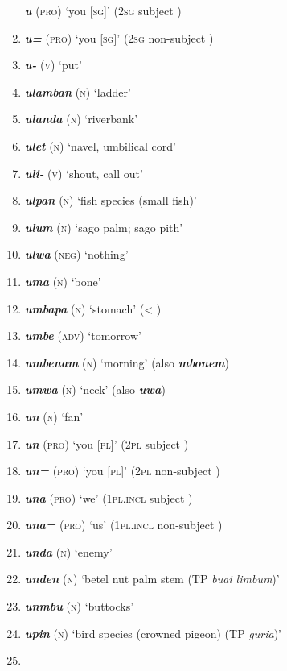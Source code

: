 \begin{enumerate}[noitemsep, label={}, align=left, widest=190, labelsep=1ex,leftmargin=*,itemindent=-10pt]
\textbf{\textit{u}} (\textsc{pro}) ‘you [\textsc{sg}]’ (2\textsc{sg} subject ) \item
\textbf{\textit{u=}} (\textsc{pro}) ‘you [\textsc{sg}]’ (2\textsc{sg} non-subject ) \item
\textbf{\textit{u-}} (\textsc{v}) ‘put’ \item
\textbf{\textit{ulamban}} (\textsc{n}) ‘ladder’ \item
\textbf{\textit{ulanda}} (\textsc{n}) ‘riverbank’ \item
\textbf{\textit{ulet}} (\textsc{n}) ‘navel, umbilical cord’ \item
\textbf{\textit{uli-}} (\textsc{v}) ‘shout, call out’ \item
\textbf{\textit{ulpan}} (\textsc{n}) ‘fish species (small fish)’ \item
\textbf{\textit{ulum}} (\textsc{n}) ‘sago palm; sago pith’ \item
\textbf{\textit{ulwa}} (\textsc{neg}) ‘nothing’ \item
\textbf{\textit{uma}} (\textsc{n}) ‘bone’ \item
\textbf{\textit{umbapa}} (\textsc{n}) ‘stomach’ (< ) \item
\textbf{\textit{umbe}} (\textsc{adv}) ‘tomorrow’ \item
\textbf{\textit{umbenam}} (\textsc{n}) ‘morning’ (also \textbf{\textit{mbonem}}) \item
\textbf{\textit{umwa}} (\textsc{n}) ‘neck’ (also \textbf{\textit{uwa}}) \item
\textbf{\textit{un}} (\textsc{n}) ‘fan’ \item
\textbf{\textit{un}} (\textsc{pro}) ‘you [\textsc{pl}]’ (\textsc{2pl} subject ) \item
\textbf{\textit{un=}} (\textsc{pro}) ‘you [\textsc{pl}]’ (\textsc{2pl} non-subject ) \item
\textbf{\textit{una}} (\textsc{pro}) ‘we’ (1\textsc{pl.incl} subject ) \item
\textbf{\textit{una=}} (\textsc{pro}) ‘us’ (1\textsc{pl.incl} non-subject ) \item
\textbf{\textit{unda}} (\textsc{n}) ‘enemy’ \item
\textbf{\textit{unden}} (\textsc{n}) ‘betel nut palm stem (TP \textit{buai limbum})’ \item
\textbf{\textit{unmbu}} (\textsc{n}) ‘buttocks’ \item
\textbf{\textit{upin}} (\textsc{n}) ‘bird species (crowned pigeon) (TP \textit{guria})’ \item

\end{enumerate}
